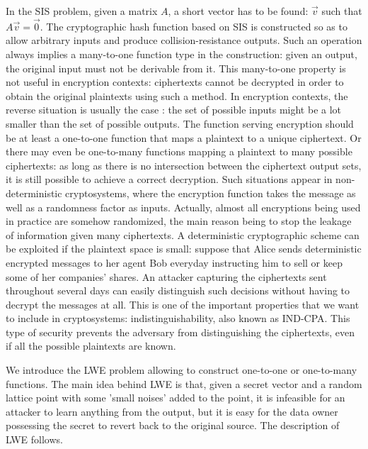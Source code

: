 In the SIS problem, given a matrix $A$, a short vector has to be found:
$\vec{v}$ such that $A\vec{v} = \vec{0}$. The cryptographic hash function 
 based on SIS is constructed so as to allow arbitrary inputs and
produce collision-resistance outputs. Such an operation always implies a
many-to-one function type in the construction: given an output, the original input must not be derivable from it. This many-to-one property is not useful
in encryption contexts: ciphertexts cannot be decrypted in order to obtain the original
plaintexts using such a method. In encryption contexts, the reverse
situation is usually the case : the set of possible inputs might be a lot smaller than the set of
possible outputs. The function serving encryption should be at least a
one-to-one function that maps a plaintext to a unique ciphertext. Or there may even
be one-to-many functions mapping a plaintext to many possible ciphertexts: as
long as there is no intersection between the ciphertext output sets, it is
still possible to achieve a correct decryption. Such situations appear in non-deterministic
cryptosystems, where the encryption function takes the message as well as a
randomness factor as inputs. Actually, almost all encryptions being used in
practice are somehow randomized, the main reason being to stop the leakage of
information given many ciphertexts. A deterministic cryptographic scheme can be
exploited if the plaintext space is small: suppose that Alice sends deterministic encrypted messages to her agent Bob everyday instructing him to sell or keep some of her companies' shares.  An attacker capturing the ciphertexts sent throughout several days can easily distinguish such decisions without having to decrypt the messages at all. This is one of the important properties that we want to include in cryptosystems: indistinguishability, also known as IND-CPA. This type of security prevents the adversary from distinguishing the ciphertexts, even if all the possible plaintexts are known.

We introduce the LWE problem \cite{regev2005lattices} allowing to construct
one-to-one or one-to-many functions. The main idea behind LWE is that, given a secret
vector and a random lattice point with some 'small noises' added to the point,
it is infeasible for an attacker to learn anything from the output, but it is
easy for the data owner possessing the secret to revert back to the original source. The
description of LWE follows.

